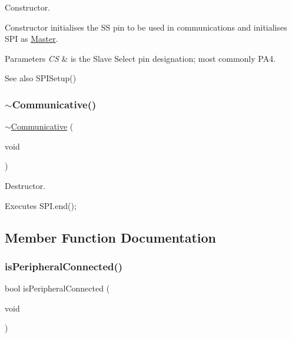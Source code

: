 Constructor. 

Constructor initialises the SS pin to be used in communications and initialises S\+PI as \mbox{\hyperlink{class_master}{Master}}. 
\begin{DoxyParams}{Parameters}
{\em CS} & is the Slave Select pin designation; most commonly P\+A4. \\
\hline
\end{DoxyParams}
\begin{DoxySeeAlso}{See also}
S\+P\+I\+Setup() 
\end{DoxySeeAlso}
\mbox{\label{class_communicative_a53c7f2ec58bfb99f0ea10e238705c3ce}} 
\subsubsection{\texorpdfstring{$\sim$Communicative()}{~Communicative()}}
{\footnotesize\ttfamily $\sim$\mbox{\hyperlink{class_communicative}{Communicative}} (\begin{DoxyParamCaption}\item[{void}]{ }\end{DoxyParamCaption})}



Destructor. 

Executes S\+P\+I.\+end(); 

\subsection{Member Function Documentation}
\mbox{\label{class_communicative_ac3d11fc6a7b276a19b1d92cd19e9a046}} 
\subsubsection{\texorpdfstring{isPeripheralConnected()}{isPeripheralConnected()}}
{\footnotesize\ttfamily bool is\+Peripheral\+Connected (\begin{DoxyParamCaption}\item[{void}]{ }\end{DoxyParamCaption})}



